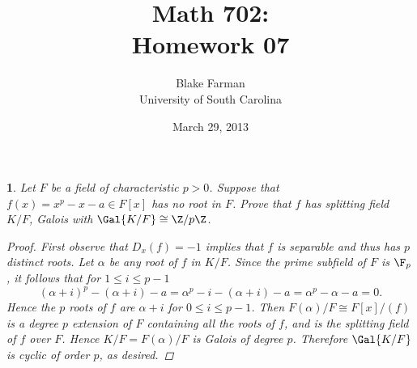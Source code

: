 \documentclass[10pt]{amsart}
\author{Blake Farman\\University of South Carolina}
\title{Math 702:\\Homework 07}
\date{March 29, 2013}
\begin{document}
\maketitle

\providecommand{\p}{\mathfrak{p}}
\providecommand{\m}{\mathfrak{m}}

\newtheorem{thm}{}
\newtheorem{lem}{Lemma}


\begin{thm}
  Let $F$ be a field of characteristic $p > 0$.
  Suppose that $f(x) = x^p - x - a \in F[x]$ has no root in $F$.
  Prove that $f$ has splitting field $K/F$, Galois with $\Gal{K/F} \cong \Z/p\Z$.

  \begin{proof}
    First observe that $D_x(f) = -1$ implies that $f$ is separable and thus has $p$ distinct roots.
    Let $\alpha$ be any root of $f$ in $K/F$.
    Since the prime subfield of $F$ is $\F_p$, it follows that for $1 \leq i \leq p-1$
    $$(\alpha + i)^p - (\alpha + i) - a = \alpha^p - i - (\alpha + i) - a = \alpha^p - \alpha - a = 0.$$
    Hence the $p$ roots of $f$ are $\alpha + i$ for $0 \leq i \leq p-1$.
    Then $F(\alpha)/F \cong F[x]/(f)$ is a degree $p$ extension of $F$ containing all the roots of $f$, and is the splitting field of $f$ over $F$.
    Hence $K/F = F(\alpha)/F$ is Galois of degree $p$.
    Therefore $\Gal{K/F}$ is cyclic of order $p$, as desired.
  \end{proof}
\end{thm}
\end{document}
